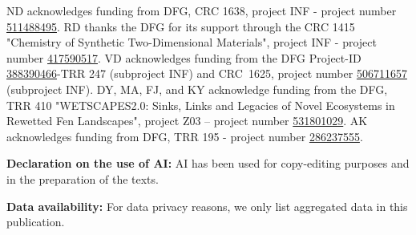 \documentclass{eceasst}
\newcommand{\geprislink}[1]{\href{https://gepris.dfg.de/gepris/projekt/#1?language=en}{#1}}
\newenvironment{aiuse}{%
  \par\vspace{11pt}%
  \noindent\textbf{Declaration on the use of AI:}\enspace}{%
  \par\vspace{11pt}}
\newenvironment{data}{%
  \par\vspace{11pt}%
  \noindent\textbf{Data availability:}\enspace}{%
  \par\vspace{11pt}}
\begin{document}
\begin{acknowledge}
ND acknowledges funding from DFG, CRC 1638, project INF - project number \geprislink{511488495}.
RD thanks the DFG for its support through the CRC 1415 "Chemistry of Synthetic Two-Dimensional Materials", project INF - project number \geprislink{417590517}.
VD acknowledges funding from the DFG Project-ID \geprislink{388390466}-TRR 247 (subproject INF) and CRC~1625, project number \geprislink{506711657} (subproject INF).
DY, MA, FJ, and KY acknowledge funding from the DFG, TRR 410 "WETSCAPES2.0: Sinks, Links and Legacies of Novel Ecosystems in Rewetted Fen Landscapes", project Z03 -- project number \geprislink{531801029}.
AK acknowledges funding from DFG, TRR 195 - project number \geprislink{286237555}.
\end{acknowledge}

\begin{aiuse}
AI has been used for copy-editing purposes and in the preparation of the texts.
\end{aiuse}

\begin{data}
For data privacy reasons, we only list aggregated data in this publication.
\end{data}



\end{document}
